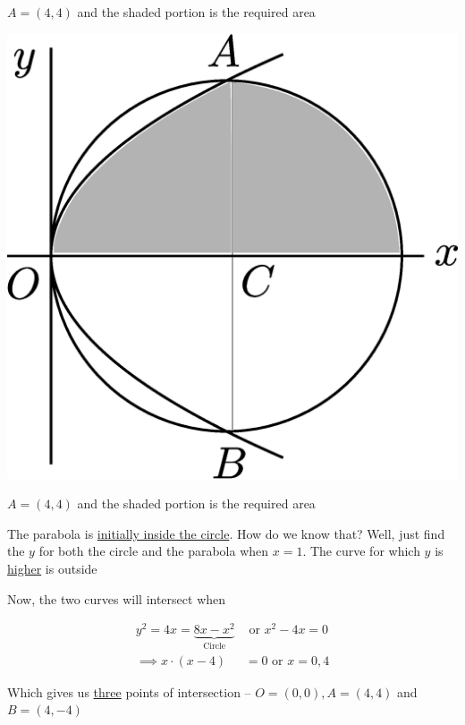 \documentclass[14pt,fleqn]{extarticle}
\begin{document}
\begin{question}
\begin{step}
\begin{options}
$A = \left(4,4 \right)$ and the shaded portion is the required area 
     \incorrect
        
        \begin{center}
\includegraphics[scale=0.2]{1381-D.eps}
\end{center}

$A = \left(4,4 \right)$ and the shaded portion is the required area 
    \end{options} 
     \reason 
     
     The parabola is \underline{initially inside the circle}. How do we know 
     that? Well, just find the $y$ for both the circle and the parabola 
     when $x=1$. The curve for which $y$ is \underline{higher} is outside\newline 
     
     Now, the two curves will intersect when 
     
     \begin{align}
     y^2 = 4x = \underbrace{8x-x^2}_{\text{Circle}}&\text{ or } x^2 - 4x = 0  \\
     \implies x\cdot \left(x-4 \right) &= 0\text{ or } x = 0,4 
\end{align}

Which gives us \underline{three} points of intersection -- $O = (0,0), A = (4,4)$ and $B=(4,-4)$ \newline 


\end{step}
\end{question}
\end{document}
